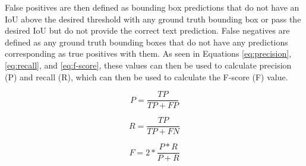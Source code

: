 \documentclass[a4paper,11pt]{article}
\begin{document}
False positives are then defined as bounding box predictions that do not have an IoU above the desired threshold with any ground truth bounding box or pass the desired IoU but do not provide the correct text prediction. False negatives are defined as any ground truth bounding boxes that do not have any predictions corresponding as true positives with them. As seen in Equations \ref{eq:precision}, \ref{eq:recall}, and \ref{eq:f-score}, these values can then be used to calculate precision (P) and recall (R), which can then be used to calculate the F-score (F) value.

\begin{equation}
\label{eq:precision}
P=\frac{TP}{TP+FP}
\end{equation}

\begin{equation}
\label{eq:recall}
R=\frac{TP}{TP+FN}
\end{equation}

\begin{equation}
\label{eq:f-score}
F=2*\frac{P*R}{P+R}
\end{equation}
\end{document}
